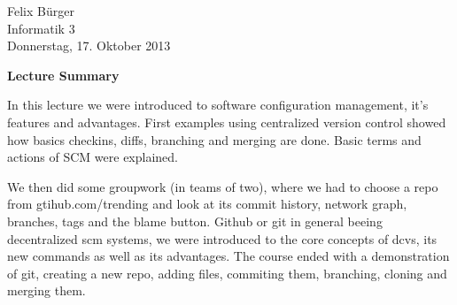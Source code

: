 \documentclass[parskip=full]{scrartcl}
\begin{document}
Felix Bürger\\
Informatik 3\\
Donnerstag, 17. Oktober 2013

\Huge\textbf{Lecture Summary}

\doublespacing
\normalsize

In this lecture we were introduced to software configuration management, it's features and advantages. First examples using centralized version control showed how basics checkins, diffs, branching and merging are done. Basic terms and actions of SCM were explained.

We then did some groupwork (in teams of two), where we had to choose a repo from gtihub.com/trending and look at its commit history, network graph, branches, tags and the blame button. Github or git in general beeing decentralized scm systems, we were introduced to the core concepts of dcvs, its new commands as well as its advantages. The course ended with a demonstration of git, creating a new repo, adding files, commiting them, branching, cloning and merging them.
\end{document}
